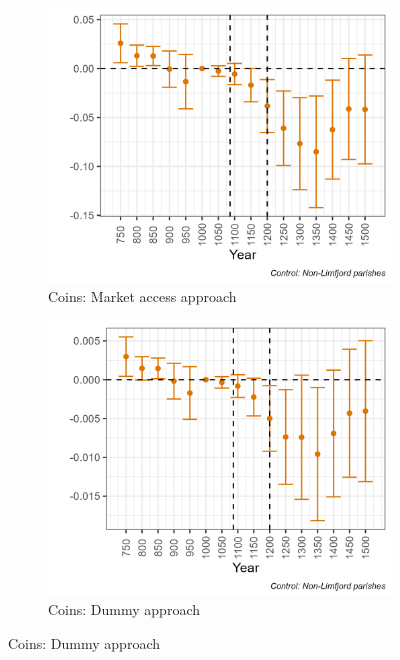 \begin{figure}[h!]
    \centering
    \caption{Archaelogical results (matched sample)}
    \begin{subfigure}[b]{0.45\textwidth}
        \centering
        \caption{\label{fig:arch1a} Coins: Market access approach}
        \includegraphics[width=\textwidth]{Plots/Regression_plots/arch_MA_coins_matched_norm.png}
    \end{subfigure}
    \hfill
    \begin{subfigure}[b]{0.45\textwidth}
        \centering
        \caption{\label{fig:arch1b} Coins: Dummy approach}
        \includegraphics[width=\textwidth]{Plots/Regression_plots/arch_dummy_coins_matched_norm.png}

\end{subfigure}
\end{figure}
